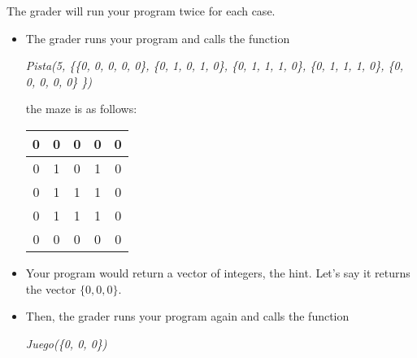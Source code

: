 \documentclass[12pt]{scrartcl}
\begin{document}
    The grader will run your program twice for each case.


        \begin{itemize}
            \item The grader runs your program and calls the function
            \begin{center}
                \textit{Pista(5, \{\{0, 0, 0, 0, 0\}, \{0, 1, 0, 1, 0\}, \{0, 1, 1, 1, 0\}, \{0, 1, 1, 1, 0\}, \{0, 0, 0, 0, 0\} \})}
            \end{center}
            the maze is as follows:
            \begin{center}
                \begin{tabular}{|c|c|c|c|c|}
                    \hline
                     0 & 0 & 0 & 0 & 0 \\
                     \hline
                     0 & 1 & 0 & 1 & 0 \\
                     \hline
                     0 & 1 & 1 & 1 & 0 \\
                     \hline
                     0 & 1 & 1 & 1 & 0 \\
                     \hline
                     0 & 0 & 0 & 0 & 0 \\
                     \hline
                \end{tabular}
            \end{center}
        \item Your program would return a vector of integers, the hint. Let's say it returns the vector $\{0, 0, 0\}$.

        \item Then, the grader runs your program again and calls the function 

        \begin{center}
            \textit{Juego(\{0, 0, 0\})}
        \end{center}
        

\end{itemize}
\end{document}
